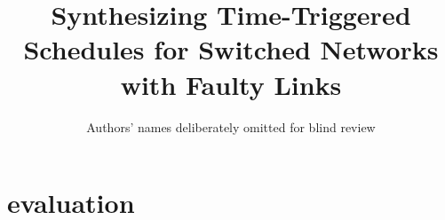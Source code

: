 \documentclass{sig-alternate}[9pt]
\theoremstyle{definition}
\begin{document}






	\title{Synthesizing Time-Triggered Schedules for Switched Networks with Faulty Links}
	\author{Authors' names deliberately omitted for blind review}




	\maketitle


\section{evaluation}
\end{document}
